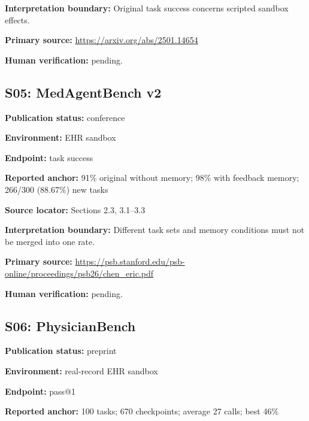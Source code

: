 \documentclass[journal,onecolumn,10pt]{IEEEtran}
\begin{document}
\noindent\textbf{Interpretation boundary:} Original task success concerns scripted sandbox effects.\par

\noindent\textbf{Primary source:} \url{https://arxiv.org/abs/2501.14654}\par
\noindent\textbf{Human verification:} pending.

\subsection*{S05: MedAgentBench v2}

\noindent\textbf{Publication status:} conference\par

\noindent\textbf{Environment:} EHR sandbox\par

\noindent\textbf{Endpoint:} task success\par

\noindent\textbf{Reported anchor:} 91\% original without memory; 98\% with feedback memory; 266/300 (88.67\%) new tasks\par

\noindent\textbf{Source locator:} Sections 2.3, 3.1–3.3\par

\noindent\textbf{Interpretation boundary:} Different task sets and memory conditions must not be merged into one rate.\par

\noindent\textbf{Primary source:} \url{https://psb.stanford.edu/psb-online/proceedings/psb26/chen_eric.pdf}\par
\noindent\textbf{Human verification:} pending.

\subsection*{S06: PhysicianBench}

\noindent\textbf{Publication status:} preprint\par

\noindent\textbf{Environment:} real-record EHR sandbox\par

\noindent\textbf{Endpoint:} pass@1\par

\noindent\textbf{Reported anchor:} 100 tasks; 670 checkpoints; average 27 calls; best 46\%\par
\end{document}
